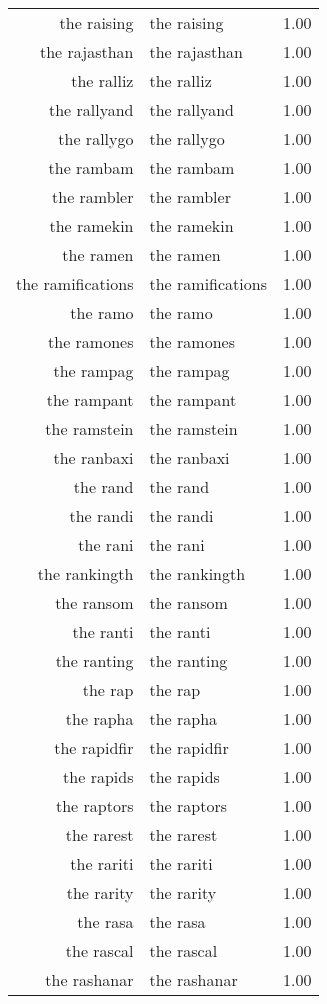 \begin{table}[ht]
\begin{tabular}{rlr}
  the raising & the raising & 1.00 \\ 
  the rajasthan & the rajasthan & 1.00 \\ 
  the ralliz & the ralliz & 1.00 \\ 
  the rallyand & the rallyand & 1.00 \\ 
  the rallygo & the rallygo & 1.00 \\ 
  the rambam & the rambam & 1.00 \\ 
  the rambler & the rambler & 1.00 \\ 
  the ramekin & the ramekin & 1.00 \\ 
  the ramen & the ramen & 1.00 \\ 
  the ramifications & the ramifications & 1.00 \\ 
  the ramo & the ramo & 1.00 \\ 
  the ramones & the ramones & 1.00 \\ 
  the rampag & the rampag & 1.00 \\ 
  the rampant & the rampant & 1.00 \\ 
  the ramstein & the ramstein & 1.00 \\ 
  the ranbaxi & the ranbaxi & 1.00 \\ 
  the rand & the rand & 1.00 \\ 
  the randi & the randi & 1.00 \\ 
  the rani & the rani & 1.00 \\ 
  the rankingth & the rankingth & 1.00 \\ 
  the ransom & the ransom & 1.00 \\ 
  the ranti & the ranti & 1.00 \\ 
  the ranting & the ranting & 1.00 \\ 
  the rap & the rap & 1.00 \\ 
  the rapha & the rapha & 1.00 \\ 
  the rapidfir & the rapidfir & 1.00 \\ 
  the rapids & the rapids & 1.00 \\ 
  the raptors & the raptors & 1.00 \\ 
  the rarest & the rarest & 1.00 \\ 
  the rariti & the rariti & 1.00 \\ 
  the rarity & the rarity & 1.00 \\ 
  the rasa & the rasa & 1.00 \\ 
  the rascal & the rascal & 1.00 \\ 
  the rashanar & the rashanar & 1.00 \\ 

\end{tabular}
\end{table}
